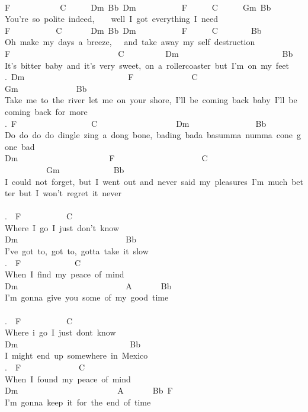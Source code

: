 {\\
F\ \ \ \ \ \ \ \ \ \ \ \ C\ \ \ \ \ \ Dm\ Bb\ Dm\ \ \ \ \ \ \ \ \ \ \ F\ \ \ \ \ \ C\ \ \ \ \ \ Gm\ Bb\\
You're\ so\ polite\ indeed,\ \ \ \ well\ I\ got\ everything\ I\ need\\
F\ \ \ \ \ \ \ \ \ \ \ C\ \ \ \ \ \ \ Dm\ Bb\ Dm\ \ \ \ \ \ \ \ \ \ \ F\ \ \ \ \ \ C\ \ \ \ \ \ \ \ Bb\\
Oh\ make\ my\ days\ a\ breeze,\ \ \ and\ take\ away\ my\ self\ destruction\\
F\ \ \ \ \ \ \ \ \ \ \ \ \ \ \ \ \ \ \ \ \ \ \ \ \ \ C\ \ \ \ \ \ \ \ \ \ Dm\ \ \ \ \ \ \ \ \ \ \ \ \ \ \ \ \ \ \ \ \ \ \ \ \ Bb\\
It's\ bitter\ baby\ and\ it's\ very\ sweet,\ on\ a\ rollercoaster\ but\ I'm\ on\ my\ feet\\
.\ Dm\ \ \ \ \ \ \ \ \ \ \ \ \ \ \ \ \ \ \ \ \ \ \ \ \ F\ \ \ \ \ \ \ \ \ \ \ \ \ \ C\ \ \ \ \ \ \ \ \ \ \ \ \ \ \ \ \ \ \ \ \ \ \ \ Gm\ \ \ \ \ \ \ \ \ \ \ \ \ \ Bb\\
Take\ me\ to\ the\ river\ let\ me\ on\ your\ shore,\ I'll\ be\ coming\ back\ baby\ I'll\ be\ coming\ back\ for\ more\\
.\ F\ \ \ \ \ \ \ \ \ \ \ \ \ \ \ \ \ \ C\ \ \ \ \ \ \ \ \ \ \ \ \ \ \ \ \ \ \ Dm\ \ \ \ \ \ \ \ \ \ \ \ \ \ \ \ Bb\\
Do\ do\ do\ do\ dingle\ zing\ a\ dong\ bone,\ bading\ bada\ basumma\ numma\ cone\ gone\ bad\\
Dm\ \ \ \ \ \ \ \ \ \ \ \ \ \ \ \ \ \ \ \ \ \ F\ \ \ \ \ \ \ \ \ \ \ \ \ \ \ \ \ \ \ \ \ C\ \ \ \ \ \ \ \ \ \ \ \ \ \ \ \ \ \ \ \ \ \ \ \ \ \ \ \ \ \ \ \ \ Gm\ \ \ \ \ \ \ \ \ \ \ \ \ Bb\\
I\ could\ not\ forget,\ but\ I\ went\ out\ and\ never\ said\ my\ pleasures\ I'm\ much\ better\ but\ I\ won't\ regret\ it\ never\\
\\
.\ \ F\ \ \ \ \ \ \ \ \ \ \ C\\
Where\ I\ go\ I\ just\ don't\ know\ \\
Dm\ \ \ \ \ \ \ \ \ \ \ \ \ \ \ \ \ \ \ \ \ \ \ \ \ \ Bb\\
I've\ got\ to,\ got\ to,\ gotta\ take\ it\ slow\\
.\ \ F\ \ \ \ \ \ \ \ \ \ \ \ \ C\\
When\ I\ find\ my\ peace\ of\ mind\\
Dm\ \ \ \ \ \ \ \ \ \ \ \ \ \ \ \ \ \ \ \ \ \ \ \ \ \ A\ \ \ \ \ \ \ Bb\\
I'm\ gonna\ give\ you\ some\ of\ my\ good\ time\\
\\
.\ \ F\ \ \ \ \ \ \ \ \ \ \ C\\
Where\ i\ go\ I\ just\ dont\ know\\
Dm\ \ \ \ \ \ \ \ \ \ \ \ \ \ \ \ \ \ \ \ \ \ \ \ \ \ \ Bb\\
I\ might\ end\ up\ somewhere\ in\ Mexico\\
.\ \ F\ \ \ \ \ \ \ \ \ \ \ \ \ \ C\\
When\ I\ found\ my\ peace\ of\ mind\\
Dm\ \ \ \ \ \ \ \ \ \ \ \ \ \ \ \ \ \ \ \ \ \ \ \ A\ \ \ \ \ \ \ Bb\ F\\
I'm\ gonna\ keep\ it\ for\ the\ end\ of\ time}
